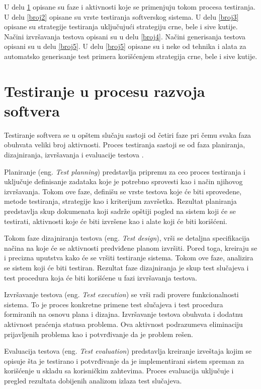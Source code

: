 \documentclass[12pt,oneside]{memoir}
\begin{document}
U delu \ref{broj1} opisane su faze i aktivnosti koje se primenjuju tokom procesa testiranja. U delu \ref{broj2} opisane su vrste testiranja softverskog sistema. U delu \ref{broj3} opisane su strategije testiranja uključujući strategiju crne, bele i sive kutije. Načini izvršavanja testova opisani su u delu \ref{broj4}. Načini generisanja testova opisani su u delu \ref{broj5}. U delu \ref{broj5} opisane su i neke od tehnika i alata za automatsko generisanje test primera korišćenjem strategija crne, bele i sive kutije. 
\section{Testiranje u procesu razvoja softvera} \label{broj1}
\par 
Testiranje softvera se u opštem slučaju sastoji od četiri faze pri čemu svaka faza obuhvata veliki broj aktivnosti. Proces testiranja sastoji se od faza planiranja, dizajniranja, izvršavanja i evaluacije testova \cite{ImportanceOfTesting}.
\par
Planiranje (eng. \textit{Test planning}) predstavlja pripremu za ceo proces testiranja i uključuje definisanje zadataka koje je potrebno sprovesti kao i način njihovog izvršavanja. Tokom ove faze, definišu se vrste testova koje će biti sprovedene, metode testiranja, strategije kao i kriterijum završetka. Rezultat planiranja predstavlja skup dokumenata koji sadrže opštiji pogled na sistem koji će se testirati, aktivnosti koje će biti izvršene kao i alate koji će biti korišćeni.
\par 
Tokom faze dizajniranja testova (eng. \textit{Test design}), vrši se detaljna specifikacija načina na koje će se aktivnosti predviđene planom izvršiti. Pored toga, kreiraju se i precizna uputstva kako će se vršiti testiranje sistema. Tokom ove faze, analizira se sistem koji će biti testiran. Rezultat faze dizajniranja je skup test slučajeva i test procedura koja će biti korišćene u fazi izvršavanja testova.
\par
Izvršavanje testova (eng. \textit{Test execution}) se vrši radi provere funkcionalnosti sistema.
To je proces konkretne primene test slučajeva i test procedura formiranih na osnovu plana i dizajna. Izvršavanje testova obuhvata i dodatnu aktivnost praćenja statusa problema. Ova aktivnost podrazumeva eliminaciju prijavljenih problema kao i potvrđivanje da je problem rešen.
\par
Evaluacija testova (eng. \textit{Test evaluation}) predstavlja kreiranje izveštaja kojim se opisuje šta je testirano i potvrđivanje da je implementirani sistem spreman za korišćenje u skladu sa korisničkim zahtevima. Proces evaluacija uključuje i pregled rezultata dobijenih analizom izlaza test slučajeva.   
\end{document}
